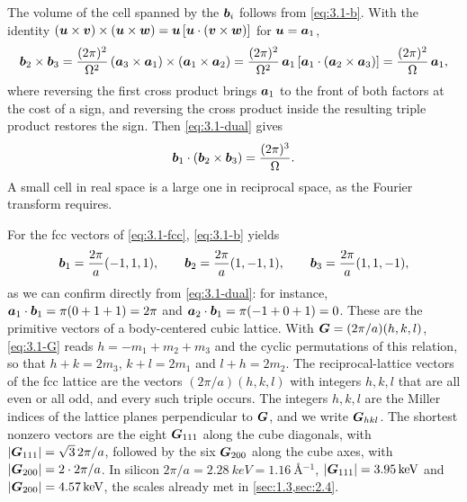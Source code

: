 The volume of the cell spanned by the $\bm{b}_i$ follows from \cref{eq:3.1-b}. With the identity $(\bm{u}\times\bm{v})\times(\bm{u}\times\bm{w}) = \bm{u}\,[\bm{u}\cdot(\bm{v}\times\bm{w})]$ for $\bm{u} = \bm{a}_1$,
\begin{equation*}
  \bm{b}_2\times\bm{b}_3 = \frac{(2\pi)^2}{\Omega^2}\,(\bm{a}_3\times\bm{a}_1)\times(\bm{a}_1\times\bm{a}_2) = \frac{(2\pi)^2}{\Omega^2}\,\bm{a}_1\,[\bm{a}_1\cdot(\bm{a}_2\times\bm{a}_3)] = \frac{(2\pi)^2}{\Omega}\,\bm{a}_1 ,
\end{equation*}
where reversing the first cross product brings $\bm{a}_1$ to the front of both factors at the cost of a sign, and reversing the cross product inside the resulting triple product restores the sign. Then \cref{eq:3.1-dual} gives
\begin{equation}
  \bm{b}_1\cdot(\bm{b}_2\times\bm{b}_3) = \frac{(2\pi)^3}{\Omega} .
  \label{eq:3.1-BZvol}
\end{equation}
A small cell in real space is a large one in reciprocal space, as the Fourier transform requires.

For the fcc vectors of \cref{eq:3.1-fcc}, \cref{eq:3.1-b} yields
\begin{equation}
  \bm{b}_1 = \frac{2\pi}{a}(-1,1,1), \qquad \bm{b}_2 = \frac{2\pi}{a}(1,-1,1), \qquad \bm{b}_3 = \frac{2\pi}{a}(1,1,-1),
  \label{eq:3.1-bfcc}
\end{equation}
as we can confirm directly from \cref{eq:3.1-dual}: for instance, $\bm{a}_1\cdot\bm{b}_1 = \pi(0 + 1 + 1) = 2\pi$ and $\bm{a}_2\cdot\bm{b}_1 = \pi(-1 + 0 + 1) = 0$. These are the primitive vectors of a body-centered cubic lattice. With $\bm{G} = (2\pi/a)(h,k,l)$, \cref{eq:3.1-G} reads $h = -m_1 + m_2 + m_3$ and the cyclic permutations of this relation, so that $h + k = 2m_3$, $k + l = 2m_1$ and $l + h = 2m_2$. The reciprocal-lattice vectors of the fcc lattice are the vectors $(2\pi/a)(h,k,l)$ with integers $h, k, l$ that are all even or all odd, and every such triple occurs. The integers $h, k, l$ are the Miller indices of the lattice planes perpendicular to $\bm{G}$, and we write $\bm{G}_{hkl}$. The shortest nonzero vectors are the eight $\bm{G}_{111}$ along the cube diagonals, with $|\bm{G}_{111}| = \sqrt3\,2\pi/a$, followed by the six $\bm{G}_{200}$ along the cube axes, with $|\bm{G}_{200}| = 2\cdot2\pi/a$. In silicon $2\pi/a = \SI{2.28}{keV} = \SI{1.16}{\angstrom^{-1}}$, $|\bm{G}_{111}| = \SI{3.95}{keV}$ and $|\bm{G}_{200}| = \SI{4.57}{keV}$, the scales already met in \cref{sec:1.3,sec:2.4}.

